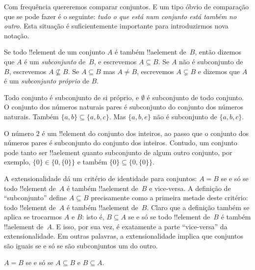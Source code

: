 \documentclass[../../../include/open-logic-section]{subfiles}
\begin{document}

\begin{explain}
Com frequência quereremos comparar conjuntos. E um tipo óbvio de comparação
que se pode fazer é o seguinte: \emph{tudo o que está num conjunto está também
no outro}. Esta situação é suficientemente importante para introduzirmos nova
notação.
\end{explain}

\begin{defn}[Subconjunto]
Se todo !!{element} de um conjunto $A$ é também !!a{element} de~$B$, então
dizemos que $A$ é um \emph{subconjunto} de~$B$, e escrevemos $A \subseteq B$. Se
$A$ não é subconjunto de~$B$, escrevemos $A \not\subseteq B$.
Se $A \subseteq B$ mas $A \neq B$, escrevemos $A \subsetneq B$ e dizemos
que $A$ é um \emph{subconjunto próprio} de $B$.
\end{defn}

\begin{ex}
Todo conjunto é subconjunto de si próprio, e $\emptyset$ é subconjunto de todo
conjunto. O conjunto dos números naturais pares é subconjunto do conjunto dos
números naturais. Também $\{ a, b \} \subseteq \{ a, b, c \}$. Mas $\{ a, b, e
\}$ não é subconjunto de $\{ a, b, c \}$.
\end{ex}

\begin{ex}
O número $2$ é um !!{element} do conjunto dos inteiros, ao passo que o
conjunto dos números pares é subconjunto do conjunto dos inteiros. Contudo, um
conjunto pode tanto ser !!a{element} quanto subconjunto de algum outro
conjunto, por exemplo, $\{0\} \in \{0, \{0\}\}$ e também $\{0\} \subseteq \{0,
\{0\}\}$.
\end{ex}

A extensionalidade dá um critério de identidade para conjuntos: $A = B$ se e só se
todo !!{element} de~$A$ é também !!a{element} de~$B$ e vice-versa.
A definição de ``subconjunto'' define $A \subseteq B$ precisamente como a
primeira metade deste critério: todo !!{element} de~$A$ é também
!!a{element} de~$B$. Claro que a definição também se aplica se trocarmos
$A$ e $B$: isto é, $B \subseteq A$ se e só se todo !!{element}
de~$B$ é também !!a{element} de~$A$. E isso, por sua vez, é exatamente a
parte ``vice-versa'' da extensionalidade. Em outras palavras, a extensionalidade
implica que conjuntos são iguais se e só se são subconjuntos um do outro.

\begin{prop}
$A = B$ se e só se $A \subseteq B$ e $B \subseteq A$.
\end{prop}
\end{document}
